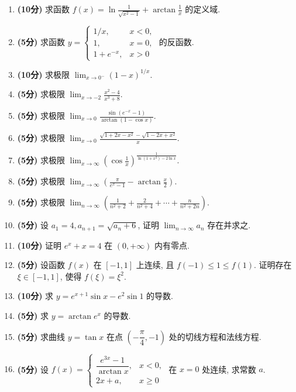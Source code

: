 \documentclass[simple]{hfutexam}
\begin{document}
\maketitle

\begin{enumerate}
\item \textbf{(10分)} 求函数 $\displaystyle f(x)=\ln\frac1{\sqrt{x^2-1}}+\arctan\frac1x$ 的定义域.
\item \textbf{(5分)} 求函数 $\displaystyle y=\begin{cases}
1/x,&x<0,\\1,&x=0,\\1+e^{-x},&x>0\end{cases}$ 的反函数.
\item \textbf{(10分)} 求极限 $\displaystyle\lim_{x\to0^-}(1-x)^{1/x}$.
\item \textbf{(5分)} 求极限 $\displaystyle\lim_{x\to-2}\frac{x^2-4}{x^3+8}$.
\item \textbf{(5分)} 求极限 $\displaystyle\lim_{x\to0}\frac{\sin(e^{-x}-1)}{\arctan(1-\cos x)}$.
\item \textbf{(5分)} 求极限 $\displaystyle\lim_{x\to0}\frac{\sqrt{1+2x-x^2}-\sqrt{1-2x+x^2}}x$. 
\item \textbf{(5分)} 求极限 $\displaystyle\lim_{x\to\infty}\left(\cos\frac1x\right)^{\frac1{\ln(1+x^2)-2\ln x}}$.
\item \textbf{(5分)} 求极限 $\displaystyle\lim_{x\to\infty}\left(\frac\pi{e^x-1}-\arctan\frac x2\right)$. 
\item \textbf{(5分)} 求极限 $\displaystyle\lim_{n\to\infty}\left(\frac1{n^2+2}+\frac2{n^2+4}+\cdots+\frac n{n^2+2n}\right)$.
\item \textbf{(5分)} 设 $a_1=4,a_{n+1}=\sqrt{a_n+6}$, 证明 $\displaystyle\lim_{n\to\infty}a_n$ 存在并求之.
\item \textbf{(10分)} 证明 $e^x+x=4$ 在 $(0,+\infty)$ 内有零点.
\item \textbf{(5分)} 设函数 $f(x)$ 在 $[-1,1]$ 上连续, 且 $f(-1)\le1\le f(1)$. 证明存在 $\xi\in[-1,1]$, 使得 $f(\xi)=\xi^2$.
\item \textbf{(10分)} 求 $y=e^{x+1}\sin x-e^2\sin1$ 的导数.
\item \textbf{(5分)} 求 $y=\arctan e^x$ 的导数.
\item \textbf{(5分)} 求曲线 $y=\tan x$ 在点 $\left(-\dfrac\pi4,-1\right)$ 处的切线方程和法线方程.
\item \textbf{(5分)} 设
$\displaystyle f(x)=\begin{cases}\dfrac{e^{3x}-1}{\arctan x},&x<0,\\2x+a,&x\ge0\end{cases}$
在 $x=0$ 处连续, 求常数 $a$.
\end{enumerate}
\newpage
\end{document}

